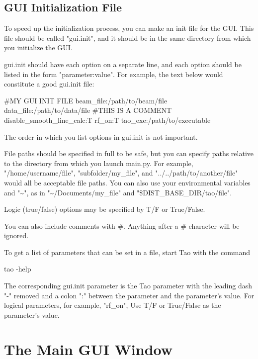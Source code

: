 
\subsection{GUI Initialization File}
\label{s:gui.init.file}

To speed up the initialization process, you can make an init file for the GUI.  This file should be called "gui.init", and it should be in the same directory from which you initialize the GUI.

gui.init should have each option on a separate line, and each option should be listed in the form "parameter:value".  For example, the text below would constitute a good gui.init file:

\begin{example}
  #MY GUI INIT FILE
  beam_file:/path/to/beam/file
  data_file:/path/to/data/file
  #THIS IS A COMMENT
  disable_smooth_line_calc:T
  rf_on:T
  tao_exe:/path/to/executable
\end{example}

The order in which you list options in gui.init is not important.

File paths should be specified in full to be safe, but you can specify paths relative to the directory from which you launch main.py.  For example, "/home/username/file", "subfolder/my_file", and "../../path/to/another/file" would all be acceptable file paths.  You can also use your environmental variables and "\textasciitilde{}", as in "\textasciitilde{}/Documents/my_file" and "\$DIST_BASE_DIR/tao/file".

Logic (true/false) options may be specified by T/F or True/False.

You can also include comments with \#.  Anything after a \# character will be ignored.

To get a list of parameters that can be set in a  file, start Tao with the command
\begin{example}
  tao -help
\end{example}
The corresponding gui.init parameter is the Tao parameter with the leading dash "-" removed and a
colon ":" between the parameter and the parameter's value. For logical parameters, for example,
"rf_on", Use T/F or True/False as the parameter's value.


\section{The Main GUI Window}
\label{s:gui.root.window}

